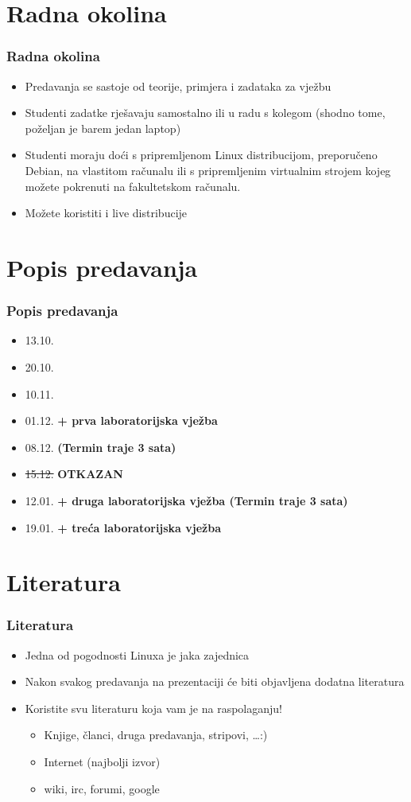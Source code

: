 \documentclass{beamer}
\begin{document}
\section{Radna okolina}
\begin{frame}[t]
\frametitle{Radna okolina}
\begin{itemize}
	\item Predavanja se sastoje od teorije, primjera i zadataka za vježbu
	\item Studenti zadatke rješavaju samostalno ili u radu s kolegom (shodno tome, poželjan je barem jedan laptop)
	\item Studenti moraju doći s pripremljenom Linux distribucijom, preporučeno Debian, na vlastitom računalu ili s pripremljenim virtualnim strojem kojeg možete pokrenuti na fakultetskom računalu.
	\item Možete koristiti i live distribucije
\end{itemize}
\end{frame}

\section{Popis predavanja}
\begin{frame}[t]
\frametitle{Popis predavanja}
\begin{itemize}
	\item 13.10.
	\item 20.10.
	\item 10.11.
	\item 01.12. \textbf{+ prva laboratorijska vježba}
	\item 08.12. \textbf{(Termin traje 3 sata)}
	\item \sout{15.12.} \textbf{OTKAZAN}
	\item 12.01. \textbf{+ druga laboratorijska vježba (Termin traje 3 sata)}
	\item 19.01. \textbf{+ treća laboratorijska vježba}
\end{itemize}
\end{frame}

\section{Literatura}
\begin{frame}[t]
\frametitle{Literatura}
\begin{itemize}
	\item Jedna od pogodnosti Linuxa je jaka zajednica
	\item Nakon svakog predavanja na prezentaciji će biti objavljena dodatna literatura
	\item Koristite svu literaturu koja vam je na raspolaganju!
	\begin{itemize}
		\item Knjige, članci, druga predavanja, stripovi, \ldots :)
		\item Internet (najbolji izvor)
		\item wiki, irc, forumi, google
	\end{itemize}
\end{itemize}
\end{frame}
\end{document}
